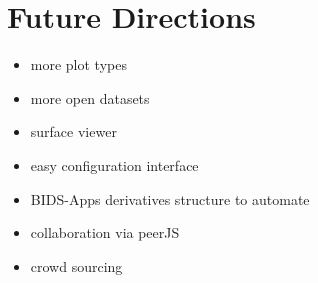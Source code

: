 \section{Future Directions}

\begin{itemize}
\item more plot types
\item more open datasets
\item surface viewer
\item easy configuration interface
\item BIDS-Apps derivatives structure to automate
\item collaboration via peerJS
\item crowd sourcing
\end{itemize}